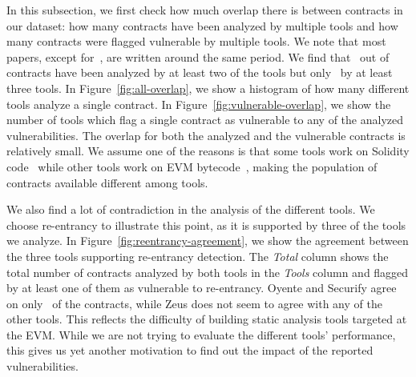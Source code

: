 
In this subsection, we first check how much overlap there is between contracts in our dataset: how many contracts have been analyzed by multiple tools and how many contracts were flagged vulnerable by multiple tools.
We note that most papers, except for~\cite{Luu2016a}, are written around the same period.
We find that~ out of~ contracts have been analyzed by at least two of the tools but only~ by at least three tools.
In Figure~\ref{fig:all-overlap}, we show a histogram of how many different tools analyze a single contract. In Figure~\ref{fig:vulnerable-overlap}, we show the number of tools which flag a single contract as vulnerable to any of the analyzed vulnerabilities. The overlap for both the analyzed and the vulnerable contracts is relatively small. We assume one of the reasons is that some tools work on Solidity code~\cite{DBLP:conf/ndss/KalraGDS18} while other tools work on EVM bytecode~\cite{Tsankov2018,Luu2016a}, making the population of contracts available different among tools.

We also find a lot of contradiction in the analysis of the different tools.
We choose re-entrancy to illustrate this point, as it is supported by three of the tools we analyze. In Figure~\ref{fig:reentrancy-agreement}, we show the agreement between the three tools supporting re-entrancy detection. The \emph{Total} column shows the total number of contracts analyzed by both tools in the \emph{Tools} column and flagged by at least one of them as vulnerable to re-entrancy. Oyente and Securify agree on only~ of the contracts, while Zeus does not seem to agree with any of the other tools.
This reflects the difficulty of building static analysis tools targeted at the EVM. While we are not trying to evaluate the different tools' performance, this gives us yet another motivation to find out the impact of the reported vulnerabilities.
